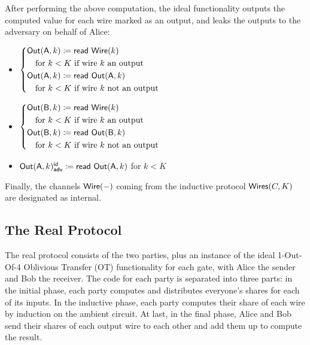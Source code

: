 \noindent After performing the above computation, the ideal functionality outputs the computed value for each wire marked as an output, and leaks the outputs to the adversary on behalf of Alice:

\begin{itemize}
\item $\begin{cases*} \Out(\A,k) \coloneqq \read{\Wire(k)} \\ \hspace{10pt} \text{for $k < K$ if wire $k$ an output} \\ \Out(\A,k) \coloneqq \read{\Out(\A,k)} \\ \hspace{10pt} \text{for $k < K$ if wire $k$ not an output} \end{cases*}$
\item $\begin{cases*} \Out(\B,k) \coloneqq \read{\Wire(k)} \\ \hspace{10pt} \text{for $k < K$ if wire $k$ an output} \\ \Out(\B,k) \coloneqq \read{\Out(\B,k)} \\ \hspace{10pt} \text{for $k < K$ if wire $k$ not an output} \end{cases*}$
\item {\color{blue} $\mathsf{Out}(\mathsf{A},k)^{\mathsf{id}}_{\mathsf{adv}} \coloneqq \mathsf{read} \ \mathsf{Out}(\mathsf{A},k)$ for $k < K$}
\end{itemize}

\noindent Finally, the channels $\mathsf{Wire}(-)$ coming from the inductive protocol $\mathsf{Wires}(C,K)$ are designated as internal.

\subsection{The Real Protocol}
The real protocol consists of the two parties, plus an instance of the ideal 1-Out-Of-4 Oblivious Transfer (OT) functionality for each gate, with Alice the sender and Bob the receiver. The code for each party is separated into three parts: in the initial phase, each party computes and distributes everyone's shares for each of its inputs. In the inductive phase, each party computes their share of each wire by induction on the ambient circuit. At last, in the final phase, Alice and Bob send their shares of each output wire to each other and add them up to compute the result.

